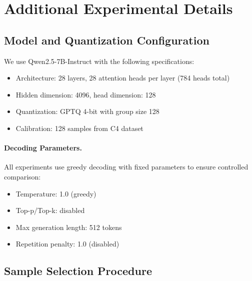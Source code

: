 
\appendix

\section{Additional Experimental Details}
\label{app:exp-details}

\subsection{Model and Quantization Configuration}
\label{app:model-config}

We use Qwen2.5-7B-Instruct with the following specifications:
\begin{itemize}
    \item Architecture: 28 layers, 28 attention heads per layer (784 heads total)
    \item Hidden dimension: 4096, head dimension: 128
    \item Quantization: GPTQ 4-bit with group size 128
    \item Calibration: 128 samples from C4 dataset
\end{itemize}

\paragraph{Decoding Parameters.}
All experiments use greedy decoding with fixed parameters to ensure controlled 
comparison:
\begin{itemize}
    \item Temperature: 1.0 (greedy)
    \item Top-p/Top-k: disabled
    \item Max generation length: 512 tokens
    \item Repetition penalty: 1.0 (disabled)
\end{itemize}

\subsection{Sample Selection Procedure}
\label{app:sample-selection}

